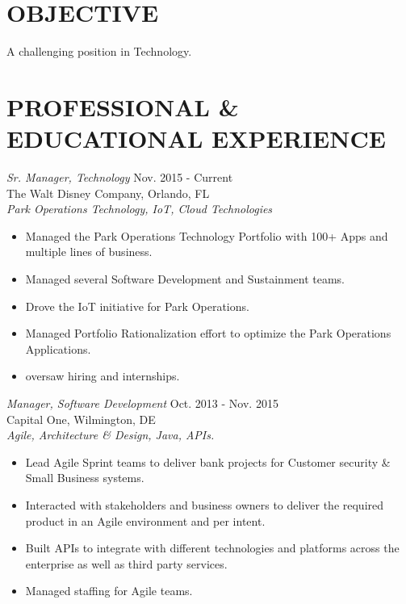 \documentclass[line,margin]{res}
\begin{document}
\address{407.601.9424 - ghaitho@gmail.com}

\begin{resume}

\section{OBJECTIVE}
A challenging position in Technology.

\section{PROFESSIONAL \& EDUCATIONAL EXPERIENCE}

{\sl Sr. Manager, Technology} \hfill        Nov. 2015 - Current  \\
The Walt Disney Company, Orlando, FL \\
  \textit{Park Operations Technology, IoT, Cloud Technologies}
  \begin{itemize} \itemsep -2pt %
      \item  Managed the Park Operations Technology Portfolio with 100+ Apps and
      multiple lines of business.
      \item Managed several Software Development and Sustainment teams.
      \item Drove the IoT initiative for Park Operations.
      \item Managed Portfolio Rationalization effort to optimize the Park Operations
      Applications.
      \item oversaw hiring and internships.
 \end{itemize}

{\sl Manager, Software Development} \hfill        Oct. 2013 - Nov. 2015  \\
Capital One, Wilmington, DE \\
  \textit{Agile, Architecture \& Design, Java, APIs.}
  \begin{itemize} \itemsep -2pt %
      \item  Lead Agile Sprint teams to deliver bank projects for Customer
      security \& Small Business systems.
      \item  Interacted with stakeholders and business owners to deliver the required product
      in an Agile environment and per intent.
      \item  Built APIs to integrate with different technologies and platforms across the enterprise as well as third party services.
      \item  Managed staffing for Agile teams.
 \end{itemize}


\end{resume}
\end{document}
